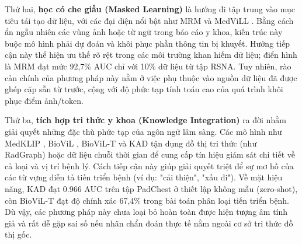 Thứ hai, \textbf{học có che giấu (Masked Learning)} là hướng đi tập trung vào mục tiêu tái tạo dữ liệu, với các đại diện nổi bật như MRM \cite{MRM} và MedViLL \cite{MedViLL}. Bằng cách ẩn ngẫu nhiên các vùng ảnh hoặc từ ngữ trong báo cáo y khoa, kiến trúc này buộc mô hình phải dự đoán và khôi phục phần thông tin bị khuyết. Hướng tiếp cận này thể hiện ưu thế rõ rệt trong các môi trường khan hiếm dữ liệu; điển hình là MRM \cite{MRM} đạt mức 92,7\% AUC chỉ với 10\% dữ liệu từ tập RSNA. Tuy nhiên, rào cản chính của phương pháp này nằm ở việc phụ thuộc vào nguồn dữ liệu đã được ghép cặp sẵn từ trước, cộng với độ phức tạp tính toán cao của quá trình khôi phục điểm ảnh/token.

Thứ ba, \textbf{tích hợp tri thức y khoa (Knowledge Integration)} ra đời nhằm giải quyết những đặc thù phức tạp của ngôn ngữ lâm sàng. Các mô hình như MedKLIP \cite{MedKLIP}, BioViL \cite{BioViL}, BioViL-T \cite{BioViL-T} và KAD \cite{KAD} tận dụng đồ thị tri thức (như RadGraph) hoặc dữ liệu chuỗi thời gian để cung cấp tín hiệu giám sát chi tiết về cả loại và vị trí bệnh lý. Cách tiếp cận này giúp giải quyết triệt để sự mơ hồ của các từ vựng diễn tả tiến triển bệnh (ví dụ: "cải thiện", "xấu đi"). Về mặt hiệu năng, KAD \cite{KAD} đạt 0.966 AUC trên tập PadChest ở thiết lập không mẫu (zero-shot), còn BioViL-T \cite{BioViL-T} đạt độ chính xác 67,4\% trong bài toán phân loại tiến triển bệnh. Dù vậy, các phương pháp này chưa loại bỏ hoàn toàn được hiện tượng âm tính giả và rất dễ gặp sai số nếu nhãn chẩn đoán thực tế nằm ngoài cơ sở tri thức đồ thị gốc.

